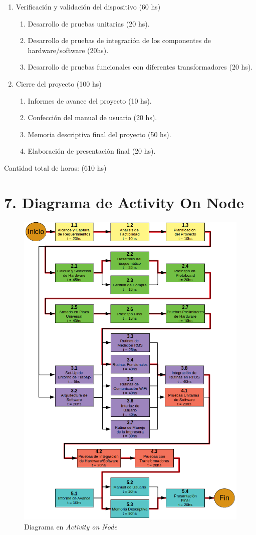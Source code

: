 \documentclass[11pt]{charter}
\begin{document}
\begin{enumerate}
\item Verificación y validación del dispositivo (60 hs)
	\begin{enumerate}
	\item Desarrollo de pruebas unitarias (20 hs).
	\item Desarrollo de pruebas de integración de los componentes de hardware/software (20hs).
	\item Desarrollo de pruebas funcionales con diferentes transformadores (20 hs).
	\end{enumerate}
\item Cierre del proyecto (100 hs)
	\begin{enumerate}
	\item  Informes de avance del proyecto (10 hs).
	\item  Confección del manual de usuario (20 hs).
	\item  Memoria descriptiva final del proyecto (50 hs).
	\item  Elaboración de presentación final (20 hs).
	\end{enumerate}		
\end{enumerate}

Cantidad total de horas: (610 hs)

\newpage

\section{7. Diagrama de Activity On Node}
\label{sec:AoN}

\begin{figure}[htpb]
\centering 
\includegraphics[width=.8\textwidth]{./Figuras/AoN.png}
\caption{Diagrama en \textit{Activity on Node}}
\label{fig:AoN}
\end{figure}
\end{document}
